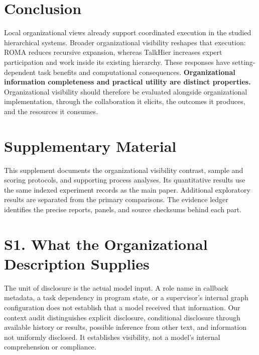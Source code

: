\documentclass[10pt,letterpaper,twocolumn]{article}
\begin{document}
\section{Conclusion}
Local or\-ga\-ni\-za\-tion\-al views already support coordinated ex\-e\-cu\-tion in the studied hierarchical sys\-tems. Broader or\-ga\-ni\-za\-tion\-al vis\-i\-bil\-i\-ty reshapes that ex\-e\-cu\-tion: ROMA reduces re\-cur\-sive ex\-pan\-sion, whereas TalkHier increases expert par\-tic\-i\-pa\-tion and work inside its ex\-ist\-ing hi\-er\-ar\-chy. These responses have setting-dependent task benefits and com\-pu\-ta\-tion\-al con\-se\-quences. \textbf{Organizational in\-for\-ma\-tion completeness and practical utility are distinct properties.} Organizational vis\-i\-bil\-i\-ty should therefore be evaluated alongside or\-ga\-ni\-za\-tion\-al implementation, through the col\-lab\-o\-ra\-tion it elicits, the out\-comes it produces, and the resources it consumes.





\clearpage
\onecolumn
\appendix
\section*{Supplementary Material}

This supplement documents the organizational visibility contrast, sample and scoring protocols, and supporting process analyses. Its quantitative results use the same indexed experiment records as the main paper. Additional exploratory results are separated from the primary comparisons. The evidence ledger identifies the precise reports, panels, and source checksums behind each part.


\section*{S1. What the Organizational Description Supplies}

The unit of disclosure is the actual model input. A role name in callback metadata, a task dependency in program state, or a supervisor's internal graph configuration does not establish that a model received that information. Our context audit distinguishes explicit disclosure, conditional disclosure through available history or results, possible inference from other text, and information not uniformly disclosed. It establishes visibility, not a model's internal comprehension or compliance.
\end{document}
